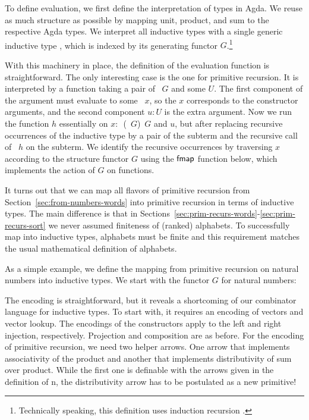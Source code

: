 \documentclass{jfp}
\begin{document}
To define evaluation, we first define the interpretation of types in Agda.
\ccDataAlg
We reuse as much structure as possible by mapping unit, product, and
sum to the respective Agda types. We interpret all inductive types with a
single generic inductive type , which is indexed by its generating
functor $G$.\footnote{Technically speaking, this definition uses
  induction recursion \cite{DBLP:journals/apal/DybjerS03}.}

With this machinery in place, the definition of the evaluation
function is straightforward.
\ccFunEval
The only interesting case is the one for primitive recursion. It is
interpreted by a function taking a pair of \Aind~$G$ and some $U$. The
first component of the argument must evaluate to some \Afold~$x$, so the $x$ corresponds
to the constructor arguments, and the second component $u:U$ is the
extra argument. Now we run the function $h$ essentially on $x :{}
$\Asubnull~(\Aind~$G$)~$G$ and $u$, but 
after replacing recursive occurrences of the inductive type by a pair
of the subterm and the recursive call of {\AP}~$h$ on the subterm. We
identify the recursive occurrences by traversing $x$ according to the
structure functor $G$ using the $\Afmap$ function below, which
implements the action of $G$ on functions. 
\ccFunFmap

It turns out that we can map all flavors of primitive recursion from
Section~\ref{sec:from-numbers-words} into primitive recursion in terms
of inductive types. The main difference is that in
Sections~\ref{sec:prim-recurs-words}-\ref{sec:prim-recurs-sort} we
never assumed finiteness of (ranked) alphabets. To successfully map into
inductive types, alphabets must be finite and this requirement
matches the usual mathematical definition of alphabets.

As a simple example, we define the mapping from primitive recursion on
natural numbers into inductive types. We start with the functor $G$
for natural numbers:
\ccDefGNat

The encoding is straightforward, but it reveals a shortcoming of our
combinator language for inductive types. To start with, it requires an
encoding of vectors and vector lookup.
\ccFunMkvec
\ccDefNatToInd
The encodings of the constructors apply {\Afold} to the left and right
injection, respectively. Projection and composition are as before. For
the encoding of primitive recursion, we need two helper arrows. One
arrow that implements associativity of the product and another that
implements distributivity of sum over product. While the first one is
definable with the arrows given in the definition of {\APR n}, the
distributivity arrow has to be postulated as a new primitive!
\ccFunAssocDist
\end{document}
